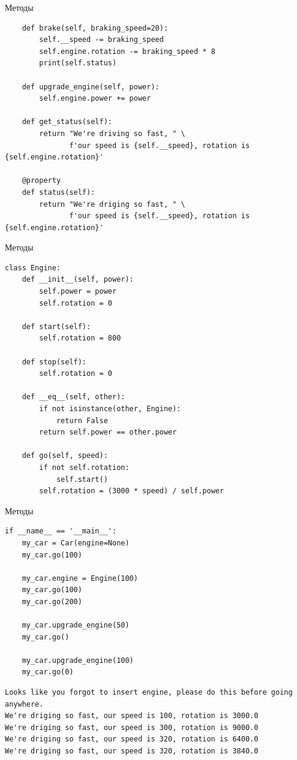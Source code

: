 \documentclass[aspectratio=169, mathserif]{beamer}	%
\begin{document}
\begin{frame}[fragile]{Методы}
\scriptsize
\begin{verbatim}
    def brake(self, braking_speed=20):
        self.__speed -= braking_speed
        self.engine.rotation -= braking_speed * 8
        print(self.status)

    def upgrade_engine(self, power):
        self.engine.power += power

    def get_status(self):
        return "We're driving so fast, " \
               f'our speed is {self.__speed}, rotation is {self.engine.rotation}'

    @property
    def status(self):
        return "We're driging so fast, " \
               f'our speed is {self.__speed}, rotation is {self.engine.rotation}'
\end{verbatim}
\vfill
\end{frame}

\begin{frame}[fragile]{Методы}
\scriptsize
\begin{verbatim}
class Engine:
    def __init__(self, power):
        self.power = power
        self.rotation = 0

    def start(self):
        self.rotation = 800

    def stop(self):
        self.rotation = 0

    def __eq__(self, other):
        if not isinstance(other, Engine):
            return False
        return self.power == other.power

    def go(self, speed):
        if not self.rotation:
            self.start()
        self.rotation = (3000 * speed) / self.power
\end{verbatim}
\vfill
\end{frame}

\begin{frame}[fragile]{Методы}
\scriptsize
\begin{verbatim}
if __name__ == '__main__':
    my_car = Car(engine=None)
    my_car.go(100)

    my_car.engine = Engine(100)
    my_car.go(100)
    my_car.go(200)

    my_car.upgrade_engine(50)
    my_car.go()

    my_car.upgrade_engine(100)
    my_car.go(0)
\end{verbatim}
\vfill
    \begin{Verbatim}[commandchars=\\\{\}]
Looks like you forgot to insert engine, please do this before going anywhere.
We're driging so fast, our speed is 100, rotation is 3000.0
We're driging so fast, our speed is 300, rotation is 9000.0
We're driging so fast, our speed is 320, rotation is 6400.0
We're driging so fast, our speed is 320, rotation is 3840.0
    \end{Verbatim}
\vfill
\end{frame}
\end{document}
